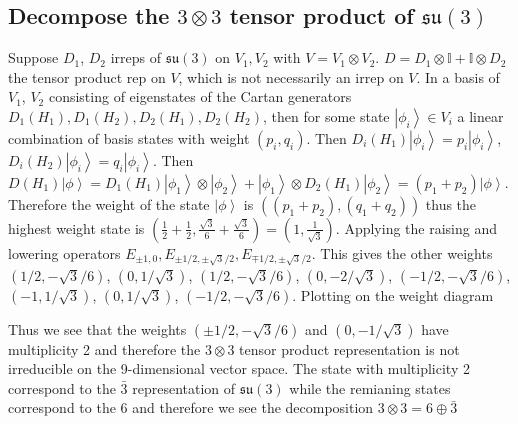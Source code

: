 \documentclass[main.tex]{subfiles}
\begin{document}
\subsection{Decompose the $3\otimes3$ tensor product of $\mathfrak{su}(3)$}
Suppose $D_1$, $D_2$ irreps of $\mathfrak{su}(3)$ on $V_1, V_2$ with $V=V_1\otimes V_2$. $D=D_1\otimes\mathbb{I}+\mathbb{I}\otimes D_2$ the tensor product rep on $V$, which is not necessarily an irrep on $V$. In a basis of $V_1$, $V_2$ consisting of eigenstates of the Cartan generators $D_1(H_1),D_1(H_2),D_2(H_1),D_2(H_2)$, then for some state $\left|\phi_i\right>\in V_i$ a linear combination of basis states with weight $(p_i,q_i)$. Then $D_i(H_1)\left|\phi_i\right>=p_i\left|\phi_i\right>$, $D_i(H_2)\left|\phi_i\right>=q_i\left|\phi_i\right>$. Then $D(H_1)\left|\phi\right>=D_1(H_1)\left|\phi_1\right>\otimes\left|\phi_2\right>+\left|\phi_1\right>\otimes D_2(H_1)\left|\phi_2\right>=(p_1+p_2)\left|\phi\right>$. Therefore the weight of the state $\left|\phi\right>$ is $((p_1+p_2),(q_1+q_2))$ thus the highest weight state is $(\frac{1}{2}+\frac{1}{2}, \frac{\sqrt{3}}{6}+\frac{\sqrt{3}}{6})=(1, \frac{1}{\sqrt{3}})$. Applying the raising and lowering operators $E_{\pm1,0},E_{\pm1/2,\pm\sqrt{3}/2},E_{\mp1/2,\pm\sqrt{3}/2}$. This gives the other weights $(1/2,-\sqrt{3}/6)$, $(0,1/\sqrt{3})$, $ (1/2,-\sqrt{3}/6)$, $(0,-2/\sqrt{3})$, $(-1/2,-\sqrt{3}/6)$, $ (-1,1/\sqrt{3})$, $(0,1/\sqrt{3})$, $(-1/2,-\sqrt{3}/6)$. Plotting on the weight diagram
\begin{figure}[H]
\centering
{}
\end{figure}
Thus we see that the weights $(\pm1/2,-\sqrt{3}/6)$ and $(0,-1/\sqrt{3})$ have multiplicity 2 and therefore the $3\otimes3$ tensor product representation is not irreducible on the 9-dimensional vector space. The state with multiplicity 2 correspond to the $\bar3$ representation of $\mathfrak{su}(3)$ while the remianing states correspond to the $6$ and therefore we see the decomposition $3\otimes3=6\oplus\bar3$
\end{document}

